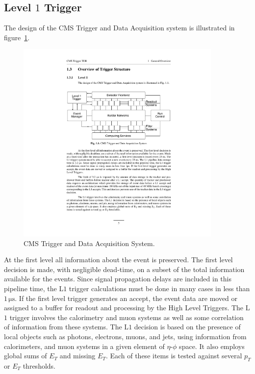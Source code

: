 \subsection{Level $1$ Trigger}
The design of the CMS Trigger and Data Acquisition system is illustrated in figure~\ref{fig:trigger}.
\begin{figure}[h!]
\centering
 \includegraphics[width=0.9\textwidth]{Images/trigger}
\caption{CMS Trigger and Data Acquisition System.}
\label{fig:trigger}
\end{figure}
At the first level all information about the event is preserved. The first level decision is made, with negligible dead-time, on a subset of the total information available for the events. Since signal propagation delays are included in this pipeline time, the L$1$ trigger calculations must be done in many cases in less than $1 \, \mathrm{\mu s}$. If the first level trigger generates an accept, the event data are moved or assigned to a buffer for readout and processing by the High Level Triggers. The L$1$ trigger involves the calorimetry and muon systems as well
as some correlation of information from these systems. The L$1$ decision is based on the presence of local objects such as photons, electrons, muons, and jets, using information from calorimeters, and muon systems in a given element of $\eta$-$\phi$ space. It also employs global sums of $E_T$ and missing $E_T$. Each of these items is tested against several $p_T$ or $E_T$ thresholds.

